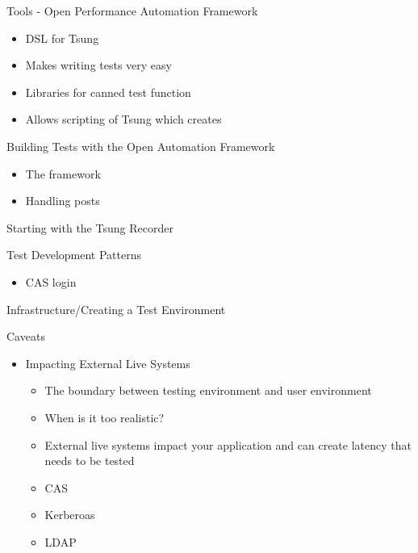 \documentclass[xcolor=dvipsnames,14pt]{beamer}
\begin{document}
\begin{frame}{Tools - Open Performance Automation Framework}
  \begin{itemize}
    \item DSL for Tsung
    \item Makes writing tests very easy
    \item Libraries for canned test function
    \item Allows scripting of Tsung which creates
  \end{itemize}
\end{frame}

\begin{frame}{Building Tests with the Open Automation Framework}
  \begin{itemize}
    \item The framework
    \item Handling posts
  \end{itemize}
\end{frame}

\begin{frame}{Starting with the Tsung Recorder}
\end{frame}

\begin{frame}{Test Development Patterns}
  \begin{itemize}
    \item CAS login
  \end{itemize}
\end{frame}

\begin{frame}{Infrastructure/Creating a Test Environment}
\end{frame}

\begin{frame}{Caveats}
  \begin{itemize}
    \item Impacting External Live Systems
      \begin{itemize}
        \item The boundary between testing environment and user environment
        \item When is it too realistic?
        \item External live systems impact your application and can create latency that needs to be tested
        \item CAS
        \item Kerberoas
        \item LDAP
      \end{itemize}
  \end{itemize}
\end{frame}
\end{document}

